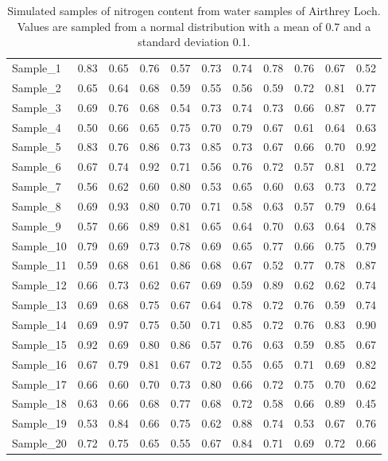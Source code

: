 \documentclass[
]{scrbook}
\begin{document}
\begin{longtable}[]{@{}lrrrrrrrrrr@{}}
\caption{\label{tab:unnamed-chunk-44}Simulated samples of nitrogen content from water samples of Airthrey Loch. Values are sampled from a normal distribution with a mean of 0.7 and a standard deviation 0.1.}\tabularnewline
\toprule
\endhead
Sample\_1 & 0.83 & 0.65 & 0.76 & 0.57 & 0.73 & 0.74 & 0.78 & 0.76 & 0.67 & 0.52 \\
Sample\_2 & 0.65 & 0.64 & 0.68 & 0.59 & 0.55 & 0.56 & 0.59 & 0.72 & 0.81 & 0.77 \\
Sample\_3 & 0.69 & 0.76 & 0.68 & 0.54 & 0.73 & 0.74 & 0.73 & 0.66 & 0.87 & 0.77 \\
Sample\_4 & 0.50 & 0.66 & 0.65 & 0.75 & 0.70 & 0.79 & 0.67 & 0.61 & 0.64 & 0.63 \\
Sample\_5 & 0.83 & 0.76 & 0.86 & 0.73 & 0.85 & 0.73 & 0.67 & 0.66 & 0.70 & 0.92 \\
Sample\_6 & 0.67 & 0.74 & 0.92 & 0.71 & 0.56 & 0.76 & 0.72 & 0.57 & 0.81 & 0.72 \\
Sample\_7 & 0.56 & 0.62 & 0.60 & 0.80 & 0.53 & 0.65 & 0.60 & 0.63 & 0.73 & 0.72 \\
Sample\_8 & 0.69 & 0.93 & 0.80 & 0.70 & 0.71 & 0.58 & 0.63 & 0.57 & 0.79 & 0.64 \\
Sample\_9 & 0.57 & 0.66 & 0.89 & 0.81 & 0.65 & 0.64 & 0.70 & 0.63 & 0.64 & 0.78 \\
Sample\_10 & 0.79 & 0.69 & 0.73 & 0.78 & 0.69 & 0.65 & 0.77 & 0.66 & 0.75 & 0.79 \\
Sample\_11 & 0.59 & 0.68 & 0.61 & 0.86 & 0.68 & 0.67 & 0.52 & 0.77 & 0.78 & 0.87 \\
Sample\_12 & 0.66 & 0.73 & 0.62 & 0.67 & 0.69 & 0.59 & 0.89 & 0.62 & 0.62 & 0.74 \\
Sample\_13 & 0.69 & 0.68 & 0.75 & 0.67 & 0.64 & 0.78 & 0.72 & 0.76 & 0.59 & 0.74 \\
Sample\_14 & 0.69 & 0.97 & 0.75 & 0.50 & 0.71 & 0.85 & 0.72 & 0.76 & 0.83 & 0.90 \\
Sample\_15 & 0.92 & 0.69 & 0.80 & 0.86 & 0.57 & 0.76 & 0.63 & 0.59 & 0.85 & 0.67 \\
Sample\_16 & 0.67 & 0.79 & 0.81 & 0.67 & 0.72 & 0.55 & 0.65 & 0.71 & 0.69 & 0.82 \\
Sample\_17 & 0.66 & 0.60 & 0.70 & 0.73 & 0.80 & 0.66 & 0.72 & 0.75 & 0.70 & 0.62 \\
Sample\_18 & 0.63 & 0.66 & 0.68 & 0.77 & 0.68 & 0.72 & 0.58 & 0.66 & 0.89 & 0.45 \\
Sample\_19 & 0.53 & 0.84 & 0.66 & 0.75 & 0.62 & 0.88 & 0.74 & 0.53 & 0.67 & 0.76 \\
Sample\_20 & 0.72 & 0.75 & 0.65 & 0.55 & 0.67 & 0.84 & 0.71 & 0.69 & 0.72 & 0.66 \\
\bottomrule
\end{longtable}
\end{document}
